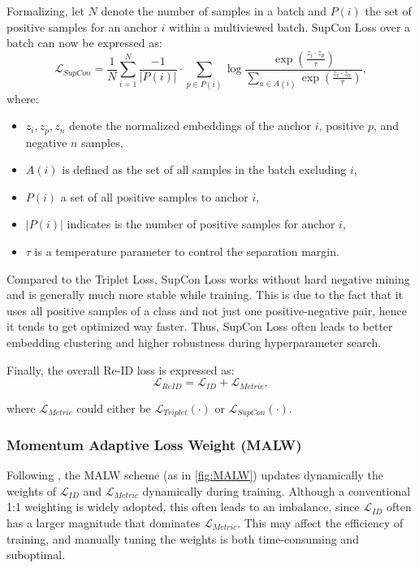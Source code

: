 Formalizing, let $N$ denote the number of samples in a batch and $P(i)$ the set of positive samples for an anchor $i$ within a multiviewed batch. SupCon Loss over a batch can now be expressed as:
\[
    \mathcal{L}_{\textit{SupCon}} = \frac{1}{N} \sum_{i=1}^N \frac{-1}{|P(i)|} \cdot \sum_{p \in P(i)} \log \frac{\exp\left( \frac{z_i \cdot z_p}{\tau} \right)}{\sum_{a \in A(i)} \exp\left( \frac{z_i \cdot z_a}{\tau} \right)},
\]
where:
\begin{itemize}
    \item $z_i, z_p, z_n$ denote the normalized embeddings of the anchor $i$, positive $p$, and negative $n$ samples,
    \item $A(i)$ is defined as the set of all samples in the batch excluding $i$,
    \item $P(i)$ a set of all positive samples to anchor $i$,
    \item $|P(i)|$ indicates is the number of positive samples for anchor $i$,
    \item $\tau$ is a temperature parameter to control the separation margin.
\end{itemize}

Compared to the Triplet Loss, SupCon Loss works without hard negative mining and is generally much more stable while training. This is due to the fact that it uses all positive samples of a class and not just one positive-negative pair, hence it tends to get optimized way faster. Thus, SupCon Loss often leads to better embedding clustering and higher robustness during hyperparameter search.

Finally, the overall Re-ID loss is expressed as:
\[
    \mathcal{L}_{\textit{ReID}} = \mathcal{L}_{\textit{ID}} + \mathcal{L}_{\textit{Metric}},
\]

where $\mathcal{L}_{\textit{Metric}}$ could either be $\mathcal{L}_{\textit{Triplet}}(\cdot)$ or $\mathcal{L}_{\textit{SupCon}}(\cdot)$. 

\subsubsection{Momentum Adaptive Loss Weight (MALW)}
Following \cite{StrongBaselineForVehicleReID}, the MALW scheme (as in \ref{fig:MALW}) updates dynamically the weights of $\mathcal{L}_{\textit{ID}}$ and $\mathcal{L}_{\textit{Metric}}$ dynamically during training. Although a conventional 1:1 weighting is widely adopted, this often leads to an imbalance, since $\mathcal{L}_{\textit{ID}}$ often has a larger magnitude that dominates $\mathcal{L}_{\textit{Metric}}$. This may affect the efficiency of training, and manually tuning the weights is both time-consuming and suboptimal.

